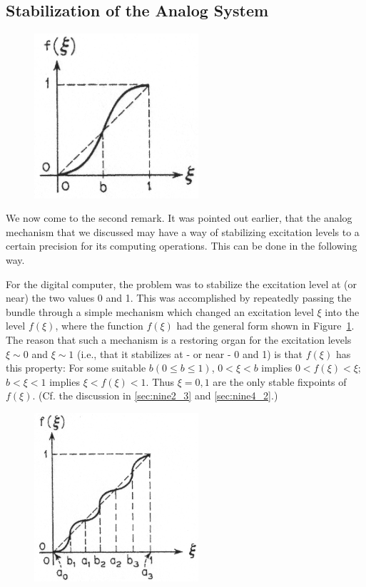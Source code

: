 \documentclass[twocolumn,preprintnumbers,amsmath,amssymb,floatfix]{revtex4}
\begin{document}
\subsection{\label{sec:twelve6}Stabilization of the Analog System}

\begin{figure}[t]
\includegraphics[width=2.4in]{fig_43}
\caption{\label{fig:43}}
\end{figure}

We now come to the second remark. It was pointed out earlier, that
the analog mechanism that we discussed may have a way of
stabilizing excitation levels to a certain precision for its
computing operations. This can be done in the following way.

For the digital computer, the problem was to stabilize the
excitation level at (or near) the two values 0 and 1. This was
accomplished by repeatedly passing the bundle through a simple
mechanism which changed an excitation level $\xi$ into the level
$f(\xi)$, where the function $f(\xi)$ had the general form shown
in Figure~\ref{fig:43}. The reason that such a mechanism is a
restoring organ for the excitation levels $\xi\sim0$ and
$\xi\sim1$ (i.e., that it stabilizes at - or near - 0 and 1) is
that $f(\xi)$ has this property: For some suitable $b(0\leq
b\leq1)$, $0<\xi<b$ implies $0<f(\xi)<\xi$; $b<\xi<1$ implies
$\xi<f(\xi)<1$. Thus $\xi=0,1$ are the only stable fixpoints of
$f(\xi)$. (Cf. the discussion in \ref{sec:nine2_3} and
\ref{sec:nine4_2}.)

\begin{figure}[t]
\includegraphics[width=2.4in]{fig_44}
\caption{\label{fig:44}}
\end{figure}
\end{document}
